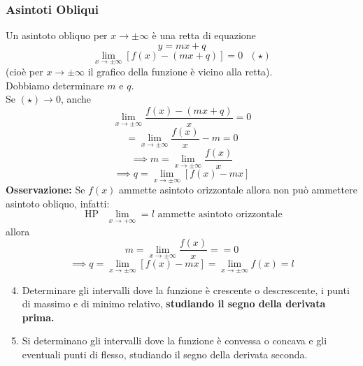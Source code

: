 \documentclass[../../main.tex]{subfiles}
\begin{document}
\subsubsection{Asintoti Obliqui}
Un asintoto obliquo per $x\to\pm\infty$ è una retta di equazione
\[
    y = mx + q
\]
\[
    \lim_{x\to\pm\infty}[f(x) - (mx + q)] = 0 \ \ \ (\star)
\]
(cioè per $x\to\pm\infty$ il grafico della funzione è vicino alla retta).\\
Dobbiamo determinare $m$ e $q$.\\
Se $(\star)\to0$, anche
\[
    \lim_{x\to\pm\infty}\dfrac{f(x) - (mx + q)}{x} = 0
\]
\[
    = \lim_{x\to\pm\infty}\dfrac{f(x)}{x} - m = 0
\]
\[
    \implies m = \lim_{x\to\pm\infty}\dfrac{f(x)}{x}
\]
\[
    \implies q = \lim_{x\to\pm\infty}[f(x) - mx]
\]
\textbf{Osservazione:} Se $f(x)$ ammette asintoto orizzontale allora non può ammettere asintoto obliquo, infatti:
\[
    \text{ HP } \ \ \lim_{x\to+\infty} = l \text{ ammette asintoto orizzontale}
\]
allora
\[
    m = \lim_{x\to\pm\infty}\dfrac{f(x)}{x} = = 0
\]
\[
    \implies q = \lim_{x\to\pm\infty}[f(x) - mx] = \lim_{x\to\pm\infty}f(x) = l
\]

\begin{enumerate}
    \setcounter{enumi}{3}
    \item Determinare gli intervalli dove la funzione è crescente o descrescente, i punti di massimo e di minimo relativo, \textbf{studiando il segno della derivata prima.}
    \item Si determinano gli intervalli dove la funzione è convessa o concava e gli eventuali punti di flesso, studiando il segno della derivata seconda.
\end{enumerate}
\end{document}
